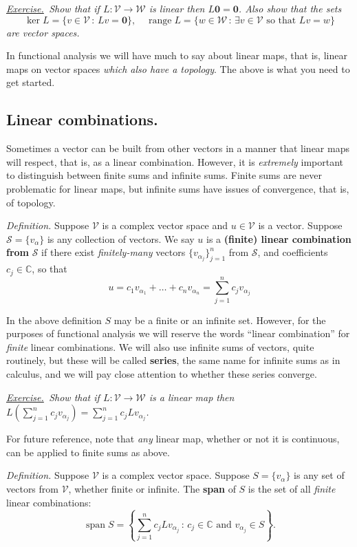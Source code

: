 \documentclass[12pt]{article}
\newcommand{\bzero}{\bm{0}}
\newcommand{\cS}{\mathcal{S}}
\newcommand{\cV}{\mathcal{V}}
\newcommand{\cW}{\mathcal{W}}
\newcommand{\CC}{\mathbb{C}}
\newcommand{\range}{\operatorname{range}}
\newcommand{\Span}{\operatorname{span}}
\newcommand{\ds}{\displaystyle}
\newcommand{\sect}[1]{\subsection*{#1.}}
\newcommand{\defin}{\emph{Definition.}\,\,}
\newcommand{\exer}[2]{\emph{\underline{Exercise.}\, #2} \vspace*{#1mm}}
\begin{document}
\clearpage\newpage
\exer{60}{Show that if $L:\cV \to \cW$ is linear then $L\bzero = \bzero$.  Also show that the sets
    $$\ker L = \{v\in\cV\,:\,Lv=\bzero\}, \quad \range L = \{w\in\cW\,:\,\exists v \in \cV \text{ so that } Lv=w\}$$
are vector spaces.}

In functional analysis we will have much to say about linear maps, that is, linear maps on vector spaces \emph{which also have a topology}.  The above is what you need to get started.


\sect{Linear combinations}

Sometimes a vector can be built from other vectors in a manner that linear maps will respect, that is, as a linear combination.  However, it is \emph{extremely} important to distinguish between finite sums and infinite sums.  Finite sums are never problematic for linear maps, but infinite sums have issues of convergence, that is, of topology.

\defin Suppose $\cV$ is a complex vector space and $u \in \cV$ is a vector.  Suppose $\cS = \{v_\alpha\}$ is any collection of vectors.  We say $u$ is a \textbf{(finite) linear combination from} $\cS$ if there exist \emph{finitely-many} vectors $\{v_{\alpha_j}\}_{j=1}^n$ from $\cS$, and coefficients $c_j\in\CC$, so that
	$$u = c_1 v_{\alpha_1} + \dots + c_n v_{\alpha_n} = \sum_{j=1}^n c_j v_{\alpha_j}$$

In the above definition $S$ may be a finite or an infinite set.  However, for the purposes of functional analysis we will reserve the words ``linear combination'' for \emph{finite} linear combinations.  We will also use infinite sums of vectors, quite routinely, but these will be called \textbf{series}, the same name for infinite sums as in calculus, and we will pay close attention to whether these series converge.

\clearpage\newpage
\exer{30}{Show that if $L:\cV \to \cW$ is a linear map then \, $\ds L\left(\sum_{j=1}^n c_j v_{\alpha_j}\right) = \sum_{j=1}^n c_j L v_{\alpha_j}$.}

For future reference, note that \emph{any} linear map, whether or not it is continuous, can be applied to finite sums as above.

\defin Suppose $\cV$ is a complex vector space.  Suppose $S = \{v_\alpha\}$ is any set of vectors from $\cV$, whether finite or infinite.  The \textbf{span} of $S$ is the set of all \emph{finite} linear combinations:
	$$\Span S = \left\{\sum_{j=1}^n c_j L v_{\alpha_j}\,:\,c_j \in \CC \text{ and } v_{\alpha_j} \in S\right\}.$$
\end{document}
